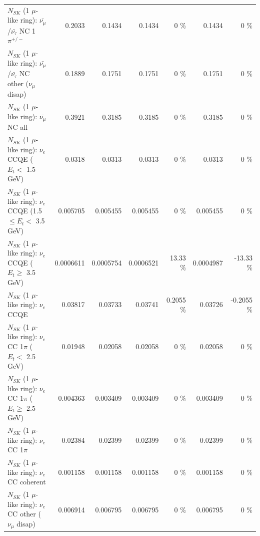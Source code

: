 \begin{table}
\begin{tabular}{| l | r | r | r  r | r  r |}
\hline
  $N_{SK}$ (1 $\mu$-like ring): $\bar{\nu_\mu}$/$\bar{\nu_\tau}$ NC 1$\pi^{+/-}$ &          0.2033 &          0.1434 &          0.1434 &        0 \%  &          0.1434 &        0 \%  \\ 
$N_{SK}$ (1 $\mu$-like ring): $\bar{\nu_\mu}$/$\bar{\nu_\tau}$ NC other ($\nu_\mu$ disap) &          0.1889 &          0.1751 &          0.1751 &        0 \%  &          0.1751 &        0 \%  \\ 
                          $N_{SK}$ (1 $\mu$-like ring): $\bar{\nu_{\mu}}$ NC all &          0.3921 &          0.3185 &          0.3185 &        0 \%  &          0.3185 &        0 \%  \\ 
\hline
\hline
\hline
                  $N_{SK}$ (1 $\mu$-like ring): $\nu_e$ CCQE ($E_{t} <$ 1.5 GeV) &          0.0318 &          0.0313 &          0.0313 &        0 \%  &          0.0313 &        0 \%  \\ 
         $N_{SK}$ (1 $\mu$-like ring): $\nu_e$ CCQE (1.5 $\leq E_{t} <$ 3.5 GeV) &        0.005705 &        0.005455 &        0.005455 &        0 \%  &        0.005455 &        0 \%  \\ 
               $N_{SK}$ (1 $\mu$-like ring): $\nu_e$ CCQE ($E_{t} \geq$ 3.5 GeV) &       0.0006611 &       0.0005754 &       0.0006521 &    13.33 \%  &       0.0004987 &   -13.33 \%  \\ 
\hline
                                      $N_{SK}$ (1 $\mu$-like ring): $\nu_e$ CCQE &         0.03817 &         0.03733 &         0.03741 &   0.2055 \%  &         0.03726 &  -0.2055 \%  \\ 
\hline
             $N_{SK}$ (1 $\mu$-like ring): $\nu_e$ CC 1$\pi$ ($E_{t} <$ 2.5 GeV) &         0.01948 &         0.02058 &         0.02058 &        0 \%  &         0.02058 &        0 \%  \\ 
          $N_{SK}$ (1 $\mu$-like ring): $\nu_e$ CC 1$\pi$ ($E_{t} \geq$ 2.5 GeV) &        0.004363 &        0.003409 &        0.003409 &        0 \%  &        0.003409 &        0 \%  \\ 
\hline
                                 $N_{SK}$ (1 $\mu$-like ring): $\nu_e$ CC 1$\pi$ &         0.02384 &         0.02399 &         0.02399 &        0 \%  &         0.02399 &        0 \%  \\ 
                               $N_{SK}$ (1 $\mu$-like ring): $\nu_e$ CC coherent &        0.001158 &        0.001158 &        0.001158 &        0 \%  &        0.001158 &        0 \%  \\ 
                $N_{SK}$ (1 $\mu$-like ring): $\nu_e$ CC other ($\nu_\mu$ disap) &        0.006914 &        0.006795 &        0.006795 &        0 \%  &        0.006795 &        0 \%  \\ 

\end{tabular}
\end{table}
